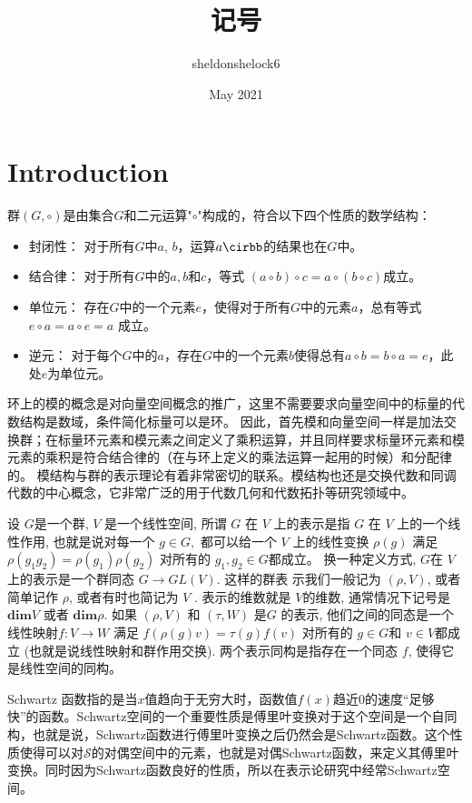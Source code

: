 \documentclass{article}
\title{记号}
\author{sheldonshelock6 }
\date{May 2021}
\begin{document}
\maketitle

\section{Introduction}
群$(G,\circ)$是由集合$G$和二元运算"$\circ$"构成的，符合以下四个性质的数学结构：
\begin{itemize}
    \item 	封闭性：	对于所有$G$中$a$, $b$，运算$a\cirbb$的结果也在$G$中。
    \item    结合律：	对于所有$G$中的$a, b$和$c$，等式 $(a\circ b)\circ  c = a\circ (b\circ c)$成立。
    \item 单位元：	存在$G$中的一个元素$e$，使得对于所有$G$中的元素$a$，总有等式
$e\circ a = a\circ e = a$ 成立。
\item 逆元：	对于每个$G$中的$a$，存在$G$中的一个元素$b$使得总有$a\circ b = b\circ a = e$，此处$e$为单位元。
\end{itemize}
环上的模的概念是对向量空间概念的推广，这里不需要要求向量空间中的标量的代数结构是数域，条件简化标量可以是环。
因此，首先模和向量空间一样是加法交换群；在标量环元素和模元素之间定义了乘积运算，并且同样要求标量环元素和模元素的乘积是符合结合律的（在与环上定义的乘法运算一起用的时候）和分配律的。
模结构与群的表示理论有着非常密切的联系。模结构也还是交换代数和同调代数的中心概念，它非常广泛的用于代数几何和代数拓扑等研究领域中。

设 $G $是一个群, $V$ 是一个线性空间, 所谓 $G$ 在 $V$ 上的表示是指 $G$ 在 $V$ 上的一个线性作用, 也就是说对每一个 $g\in G,$ 都可以给一个 $V$ 上的线性变换 $\rho (g)$ 满足 $\rho(g_1g_2) = \rho(g_1)\rho(g_2)$
对所有的 $g_1, g_2 \in G $都成立。 换一种定义方式, $G$在 $V$ 上的表示是一个群同态 $G \rightarrow GL(V )$. 这样的群表
示我们一般记为 $(\rho, V )$, 或者简单记作 $\rho$, 或者有时也简记为 $V$ . 表示的维数就是 $V $的维数, 通常情况下记号是 $\mathbf{dim} V$ 或者 $\mathbf{dim} \rho$. 如果 $(\rho, V )$ 和 $(\tau, W)$ 是$ G$ 的表示, 他们之间的同态是一个线性映射$f : V \rightarrow W$ 满足 $f(\rho(g)v) = \tau (g)f(v)$ 对所有的 $g \in G $和 $v\in V $都成立 (也就是说线性映射和群作用交换). 两个表示同构是指存在一个同态 $f$, 使得它是线性空间的同构。

Schwartz 函数指的是当$x$值趋向于无穷大时，函数值$f(x)$趋近0的速度“足够快”的函数。Schwartz空间的一个重要性质是傅里叶变换对于这个空间是一个自同构，也就是说，Schwartz函数进行傅里叶变换之后仍然会是Schwartz函数。这个性质使得可以对$\mathcal {S}$的对偶空间中的元素，也就是对偶Schwartz函数，来定义其傅里叶变换。同时因为Schwartz函数良好的性质，所以在表示论研究中经常Schwartz空间。
\end{document}
